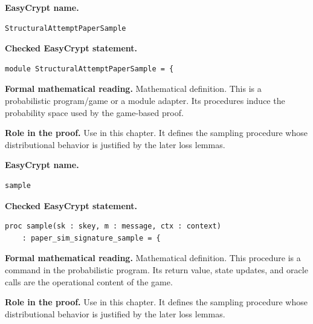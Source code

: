 \begin{formaldefinition}
\noindent\textbf{EasyCrypt name.}
\begin{lstlisting}[language=EasyCrypt,basicstyle=\ttfamily\scriptsize]
StructuralAttemptPaperSample
\end{lstlisting}
\noindent\textbf{Checked EasyCrypt statement.}
\begin{lstlisting}[language=EasyCrypt,basicstyle=\ttfamily\scriptsize]
module StructuralAttemptPaperSample = {
\end{lstlisting}
\noindent\textbf{Formal mathematical reading.}
Mathematical definition. This is a probabilistic program/game or a module adapter.  Its procedures induce the probability space used by the game-based proof.

\noindent\textbf{Role in the proof.}
Use in this chapter. It defines the sampling procedure whose distributional behavior is justified by the later loss lemmas.

\end{formaldefinition}

\begin{formaldefinition}
\noindent\textbf{EasyCrypt name.}
\begin{lstlisting}[language=EasyCrypt,basicstyle=\ttfamily\scriptsize]
sample
\end{lstlisting}
\noindent\textbf{Checked EasyCrypt statement.}
\begin{lstlisting}[language=EasyCrypt,basicstyle=\ttfamily\scriptsize]
proc sample(sk : skey, m : message, ctx : context)
    : paper_sim_signature_sample = {
\end{lstlisting}
\noindent\textbf{Formal mathematical reading.}
Mathematical definition. This procedure is a command in the probabilistic program.  Its return value, state updates, and oracle calls are the operational content of the game.

\noindent\textbf{Role in the proof.}
Use in this chapter. It defines the sampling procedure whose distributional behavior is justified by the later loss lemmas.

\end{formaldefinition}

